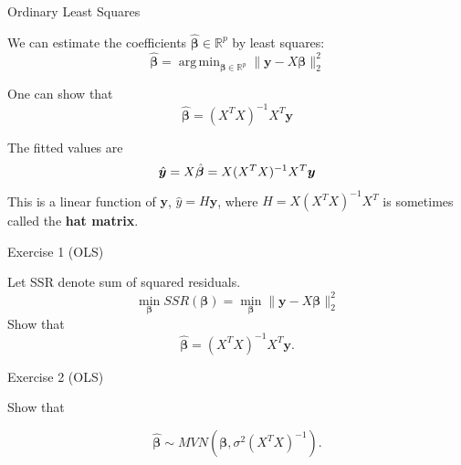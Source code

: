 \documentclass[
  ignorenonframetext,
]{beamer}
\newcommand{\by}   {\bm{y}}
\newcommand{\hbeta}   {\hat{\beta}}
\newcommand{\hy}   {\hat{y}}
\DeclareMathOperator*{\argmin}{arg\,min}
\newcommand{\R}{\mathbb{R}}
\newcommand{\bbeta}{\bm{\beta}}
\begin{document}
\begin{frame}{Ordinary Least Squares}
\protect\hypertarget{ordinary-least-squares}{}

We can estimate the coefficients \(\hat{\bm{\beta}} \in \R^p\) by least
squares:
\[\hat{\bm{\beta}} = \argmin_{\bbeta \in \R^p} \|\by-X\bbeta\|_2^2\]

One can show that \[\hat{\bm{\beta}} = (X^T X)^{-1} X^T \by\]

\bigskip

The fitted values are
\[\textcolor{black}{\hat{\bm{y}}} = X\hat{\bm{\beta}} = X(X^T X)^{-1} X^T \by\]
This is a linear function of \(\by\), \(\hy = H\by\), where
\(H=X(X^T X)^{-1} X^T\) is sometimes called the \textbf{hat matrix}.

\end{frame}

\begin{frame}{Exercise 1 (OLS)}
\protect\hypertarget{exercise-1-ols}{}

Let SSR denote sum of squared residuals.
\[ \min_{\bbeta} SSR(\bbeta) = \min_{\bbeta} \|\by-X{\bm{\beta}}\|_2^2\]
Show that \[\hat{\bm{\beta}}  = (X^TX)^{-1}X^T\by.\]

\end{frame}


\begin{frame}{Exercise 2 (OLS)}
\protect\hypertarget{exercise-2-ols}{}

Show that

\[\hat{\bm{\beta}} \sim MVN(\bbeta, \sigma^2  (X^TX)^{-1}).\]

\end{frame}
\end{document}
